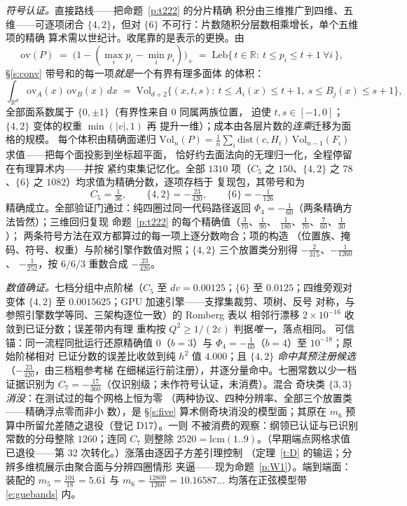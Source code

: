 \documentclass[11pt]{article}
\numberwithin{equation}{section}
\theoremstyle{definition}
\theoremstyle{remark}
\begin{document}
\emph{符号认证。}直接路线——把命题~\ref{p:t222} 的分片精确
积分由三维推广到四维、五维——可逐项闭合 $\{4,2\}$，但对
$\{6\}$ 不可行：片数随积分层数相乘增长，单个五维项的精确
算术需以世纪计。收尾靠的是表示的更换。由
\[
\mathrm{ov}(P)\;=\;\bigl(1-(\max_i p_i-\min_i p_i)\bigr)_+
\;=\;\mathrm{Leb}\{\,t\in\mathbb R:\ t\le p_i\le t+1\ \forall
i\,\},
\]
\S\ref{s:conv} 带号和的每一项\emph{就是}一个有界有理多面体
的体积：
\[
\int_{\mathbb R^d}\mathrm{ov}_A(x)\,\mathrm{ov}_B(x)\,dx
\;=\;\mathrm{Vol}_{d+2}\bigl\{(x,t,s):\ t\le A_i(x)\le t+1,\
s\le B_j(x)\le s+1\bigr\},
\]
全部面系数属于 $\{0,\pm1\}$（有界性来自 $0$ 同属两族位置，
迫使 $t,s\in[-1,0]$；$\{4,2\}$ 变体的权重 $\min(|v|,1)$ 再
提升一维）；成本由各层片数的\emph{连乘}迁移为面格的规模。
每个体积由精确面递归
$\mathrm{Vol}_n(P)=\tfrac1n\sum_i\mathrm{dist}(c,H_i)\,
\mathrm{Vol}_{n-1}(F_i)$ 求值——把每个面投影到坐标超平面，
恰好约去面法向的无理归一化，全程停留在有理算术内——并按
紧约束集记忆化。全部 $1310$ 项（$C_5$ 之 $150$、$\{4,2\}$
之 $78$、$\{6\}$ 之 $1082$）均求值为精确分数，逐项存档于
复现包，其带号和为
\[
C_5=\tfrac1{36},\qquad \{4,2\}=-\tfrac{23}{420},\qquad
\{6\}=-\tfrac1{126}
\]
精确成立。全部验证门通过：纯四圈过同一代码路径返回
$\Phi_4=-\tfrac1{60}$（两条精确方法皆然）；三维回归复现
命题~\ref{p:t222} 的每个精确值（$\tfrac3{70}$、$\tfrac1{90}$、
$\tfrac1{180}$、$\tfrac1{70}$、$\tfrac7{60}$、$\tfrac1{30}$）；
两条符号方法在双方都算过的每一项上逐分数吻合；项的构造
（位置族、掩码、符号、权重）与阶梯引擎作数值对照；$\{4,2\}$
三个放置类分别得 $-\tfrac2{315}$、$-\tfrac1{1260}$、
$-\tfrac1{252}$，按 $6/6/3$ 重数合成 $-\tfrac{23}{420}$。

\emph{数值确证。}七档分组中点阶梯（$C_5$ 至
$dv=0.00125$；$\{6\}$ 至 $0.0125$；四维旁观对变体 $\{4,2\}$
至 $0.0015625$；GPU 加速引擎——支撑集裁剪、项树、反号
对称，与参照引擎数学等同、三架构逐位一致）的 Romberg 表以
相邻行漂移 $2\times10^{-16}$ 收敛到已证分数；误差带内有理
重构按 $Q^{2}\ge1/(2\varepsilon)$ 判据\emph{唯一}，落点相同。
可信锚：同一流程同批运行还原精确值 $0$（$b=3$）与
$\Phi_4=-\tfrac1{60}$（$b=4$）至 $10^{-18}$；原始阶梯相对
已证分数的误差比收敛到纯 $h^{2}$ 值 $4.000$；且 $\{4,2\}$
\emph{命中其预注册候选}（$-\tfrac{23}{420}$，由三档粗参考梯
在细梯运行前注册），并逐分量命中。七圈常数以少一档证据识别为
$C_7=-\tfrac{17}{360}$（仅识别级；未作符号认证，未消费）。混合
奇块类 $\{3,3\}$ \emph{消没}：在测试过的每个网格上恒为零
（两种协议、四种分辨率、全部三个放置类——精确浮点零而非小
数），是 \S\ref{s:five} 算术侧奇块消没的模型面；其原在
$m_6$ 预算中所留允差随之退役（登记 D17）。一则
不被消费的观察：纲领已认证与已识别常数的分母整除 $1260$；连同
$C_7$ 则整除 $2520=\mathrm{lcm}(1..9)$。（早期端点网格求值
已退役——第 32 次转化。）涨落由逐因子方差引理控制
（定理~\ref{t:D} 的输运；分辨多维梳展示由聚合面与分辨四圈情形
夹逼——现为命题~\ref{p:W1}）。端到端面：装配的
$m_5=\tfrac{101}{18}=5.6\overline{1}$ 与
$m_6=\tfrac{12809}{1260}=10.16587\ldots$ 均落在正弦模型带
\eqref{e:guebands} 内。
\end{document}

